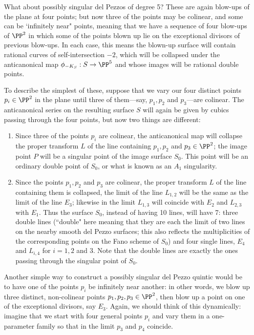 What about possibly singular del Pezzos of degree 5? These are again blow-ups of the plane at four points; but now three of the points may be colinear, and some can be `infinitely near" points, meaning that we have a sequence of four blow-ups of $\PP^2$ in which some of the points blown up lie on the exceptional divisors of previous blow-ups. In each case, this means the blown-up surface will contain rational curves of self-intersection $-2$, which will be collapsed under the anticanonical map $\phi_{-K_S} : S \to \PP^5$ and whose images will be rational double points.

To describe the simplest of these, suppose that we vary our four distinct points  $p_i \in \PP^2$ in the plane until three of them---say, $p_1, p_2$ and $p_3$---are colinear. The anticanonical series on the resulting surface $S$ will again be given by cubics passing through the four points, but now two things are different:

\begin{enumerate}

\item Since three of the points $p_i$ are colinear, the anticanonical map will collapse the proper transform $L$ of the line containing $p_1, p_2$ and $p_3 \in \PP^2$; the image point $P$ will be a singular point of the image surface $S_0$. This point will be an ordinary double point of $S_0$, or what is known as an $A_1$ singularity.

\item Since the points $p_1, p_2$ and $p_3$ are colinear, the proper transform $L$ of the line containing them is collapsed, the limit of the line $L_{1,2}$ will be the same as the limit of the line $E_3$; likewise in the limit $L_{1,3}$ will coincide with $E_2$ and $L_{2,3}$ with $E_1$. Thus the surface $S_0$, instead of having 10 lines, will have 7: three double lines (``double" here meaning that they are each the limit of two lines on the nearby smooth del Pezzo surfaces; this also reflects the multiplicities of the corresponding points on the Fano scheme of $S_0$) and four single lines, $E_4$ and $L_{i,4}$ for $i = 1, 2$ and $3$. Note that the double lines are exactly the ones passing through the singular point of $S_0$.

\end{enumerate}

Another simple way to construct a possibly singular del Pezzo quintic would be to have one of the points $p_i$ be infinitely near another: in other words, we blow up three distinct, non-colinear points $p_1,p_2, p_3 \in \PP^2$, then blow up a point on one of the exceptional divisors, say $E_3$. Again, we should think of this dynamically: imagine that we start with four general points $p_i$ and vary them in a one-parameter family so that in the limit $p_3$ and $p_4$ coincide.

